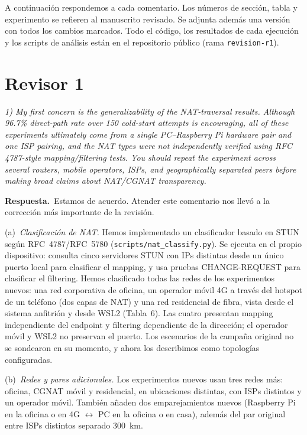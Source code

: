 \documentclass[11pt,a4paper]{article}
\newenvironment{comment}{\par\medskip\noindent\begin{minipage}{\linewidth}\color{blue!45!black}\itshape}{\end{minipage}\par}
\newcommand{\reply}{\par\smallskip\noindent\textbf{Respuesta.}~}
\begin{document}
A continuación respondemos a cada comentario. Los números de sección, tabla y experimento se refieren al manuscrito revisado. Se adjunta además una versión con todos los cambios marcados. Todo el código, los resultados de cada ejecución y los scripts de análisis están en el repositorio público (rama \texttt{revision-r1}).

\section*{Revisor 1}

\begin{comment}
1) My first concern is the generalizability of the NAT-traversal results. Although 96.7\% direct-path rate over 150 cold-start attempts is encouraging, all of these experiments ultimately come from a single PC--Raspberry Pi hardware pair and one ISP pairing, and the NAT types were not independently verified using RFC 4787-style mapping/filtering tests. You should repeat the experiment across several routers, mobile operators, ISPs, and geographically separated peers before making broad claims about NAT/CGNAT transparency.
\end{comment}
\reply Estamos de acuerdo. Atender este comentario nos llevó a la corrección más importante de la revisión.

(a)~\emph{Clasificación de NAT.} Hemos implementado un clasificador basado en STUN según RFC~4787/RFC~5780 (\texttt{scripts/\allowbreak nat\_classify.py}). Se ejecuta en el propio dispositivo: consulta cinco servidores STUN con IPs distintas desde un único puerto local para clasificar el mapping, y usa pruebas CHANGE-REQUEST para clasificar el filtering. Hemos clasificado todas las redes de los experimentos nuevos: una red corporativa de oficina, un operador móvil 4G a través del hotspot de un teléfono (dos capas de NAT) y una red residencial de fibra, vista desde el sistema anfitrión y desde WSL2 (Tabla~6). Las cuatro presentan mapping independiente del endpoint y filtering dependiente de la dirección; el operador móvil y WSL2 no preservan el puerto. Los escenarios de la campaña original no se sondearon en su momento, y ahora los describimos como topologías configuradas.

(b)~\emph{Redes y pares adicionales.} Los experimentos nuevos usan tres redes más: oficina, CGNAT móvil y residencial, en ubicaciones distintas, con ISPs distintos y un operador móvil. También añaden dos emparejamientos nuevos (Raspberry Pi en la oficina o en 4G $\leftrightarrow$ PC en la oficina o en casa), además del par original entre ISPs distintos separado 300~km.
\end{document}
